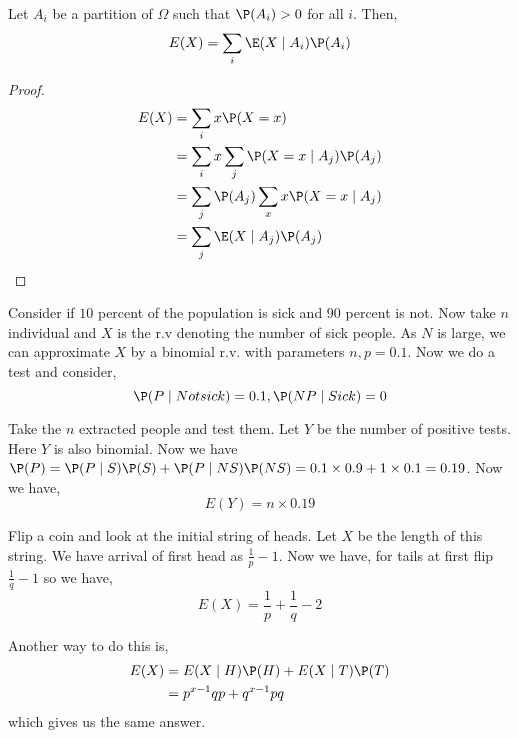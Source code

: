 \begin{theorem}
	Let $A_i$ be a partition of $\Omega$ such that $\P(A_i) > 0$ for all $i$. Then,
	$$ E(X) = \sum_{i} \E(X \mid A_i) \P(A_i) $$
\end{theorem}
\begin{proof}
	\begin{align*}
		 E(X) &= \sum_{i} x \P(X = x)\\
		      &= \sum_{i} x \sum_{j} \P(X = x \mid A_j) \P(A_j) \\
		      &= \sum_{j} \P(A_j) \sum_{x} x \P(X = x \mid A_j) \\
		      &= \sum_{j} \E(X \mid A_j) \P(A_j)
	\end{align*}
\end{proof}

\begin{eg}
	Consider if $10$ percent of the population is sick and  $90$ percent is not. Now  take $n$ individual and $X$ is the r.v denoting the number of sick people. As $N$ is large, we can approximate $X$ by a binomial r.v. with parameters $n, p = 0.1$. Now we do a test and consider, 
	$$ \P(P \mid Not sick) = 0.1, \P(NP \mid Sick) = 0 $$ 

	Take the $n$ extracted people and test them. Let $Y$ be the number of positive tests. Here $Y$ is also binomial. Now we have $\P(P) = \P(P \mid S) \P(S) + \P(P \mid NS) \P(NS) = 0.1 \times 0.9 + 1 \times 0.1 = 0.19$. Now we have,
	$$ E(Y) = n \times 0.19 $$
\end{eg}

\begin{eg}
	Flip a coin and look at the initial string of heads. Let $X$ be the length of this string. We have arrival of first head as $\frac{1}{p} - 1$. Now we have, for tails at first flip $\frac{1}{q} - 1$ so we have, 
	$$ E(X) = \frac{1}{p} + \frac{1}{q} - 2 $$ 


	\vspace{1em}
	
	Another way to do this is,
	\begin{align*}
		E(X) &= E(X \mid H) \P(H) + E(X \mid T) \P(T) \\
		     &= p^{x - 1}qp + q^{x - 1}pq
	\end{align*}
	which gives us the same answer.

\end{eg}
